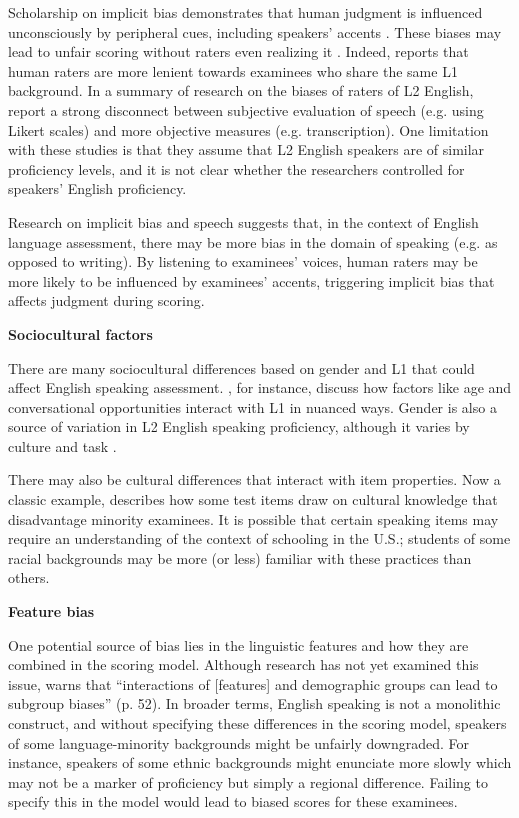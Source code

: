 \documentclass [PhD] {uclathes}
\begin{document}
Scholarship on implicit bias demonstrates that human judgment is influenced unconsciously by peripheral cues, including speakers’ accents \citep{kang2021social}. These biases may lead to unfair scoring without raters even realizing it \citep{greenwald1995}. Indeed, \citet{winke2013} reports that human raters are more lenient towards examinees who share the same L1 background. In a summary of research on the biases of raters of L2 English, \citet{lindemann2013reliably} report a strong disconnect between subjective evaluation of speech (e.g. using Likert scales) and more objective measures (e.g. transcription). One limitation with these studies is that they assume that L2 English speakers are of similar proficiency levels, and it is not clear whether the researchers controlled for speakers’ English proficiency. 

Research on implicit bias and speech suggests that, in the context of English language assessment, there may be more bias in the domain of speaking (e.g. as opposed to writing). By listening to examinees’ voices, human raters may be more likely to be influenced by examinees’ accents, triggering implicit bias that affects judgment during scoring.

\noindent \textbf{Sociocultural factors} \;

There are many sociocultural differences based on gender and L1 that could affect English speaking assessment. \citet{derwing2013development}, for instance, discuss how factors like age and conversational opportunities interact with L1 in nuanced ways. Gender is also a source of variation in L2 English speaking proficiency, although it varies by culture and task \citep{denies2022mapping}. 

There may also be cultural differences that interact with item properties. Now a classic example, \citet{freedle2003correcting} describes how some test items draw on cultural knowledge that disadvantage minority examinees. It is possible that certain speaking items may require an understanding of the context of schooling in the U.S.; students of some racial backgrounds may be more (or less) familiar with these practices than others. 

\noindent \textbf{Feature bias} \;

One potential source of bias lies in the linguistic features and how they are combined in the scoring model. Although research has not yet examined this issue, \citet{zhang2019assessing} warns that “interactions of [features] and demographic groups can lead to subgroup biases” (p. 52). In broader terms, English speaking is not a monolithic construct, and without specifying these differences in the scoring model, speakers of some language-minority backgrounds might be unfairly downgraded. For instance, speakers of some ethnic backgrounds might enunciate more slowly which may not be a marker of proficiency but simply a regional difference. Failing to specify this in the model would lead to biased scores for these examinees.
\end{document}
